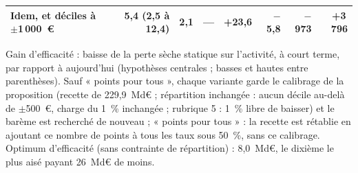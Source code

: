 \begin{table}[!htbp]
{\begin{tabular}{@{}lrrrrrrr@{}}
\quad Idem, et déciles à $\pm$1\,000~€ & 5,4 (2,5 à 12,4) & 2,1 & --- & +23,6 & $-$5,8 & $-$973 & +3\,796 \\
\bottomrule
\end{tabular}}
\par\vspace{3pt}\parbox{\linewidth}{\raggedright\scriptsize\color{encre}
Gain d'efficacité : baisse de la perte sèche statique sur l'activité, à court terme, par rapport à aujourd'hui (hypothèses centrales ; basses et hautes entre parenthèses). Sauf « points pour tous », chaque variante garde le calibrage de la proposition (recette de 229,9~Md€ ; répartition inchangée : aucun décile au-delà de $\pm$500~€, charge du 1~\% inchangée ; rubrique 5 : 1~\% libre de baisser) et le barème est recherché de nouveau ; « points pour tous » : la recette est rétablie en ajoutant ce nombre de points à tous les taux sous 50~\%, sans ce calibrage. Optimum d'efficacité (sans contrainte de répartition) : 8,0~Md€, le dixième le plus aisé payant 26~Md€ de moins.}
\end{table}

